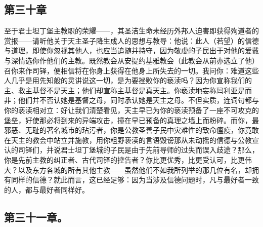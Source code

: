 
\subsection{第三十章}

\par

至于君士坦丁堡主教职的荣耀——，其圣洁生命未经历外邦人迫害即获得殉道者的赏报——请听他关于天主圣子降生成人的思想与教导：他说：此人（若望）的信德与道理，即使你忽视其他人，也应当追随并持守，因为敬虔的子民出于对他的爱戴与深情选你作他们的主教。既然教会从安提约基雅教会（此教会从前亦选立了他）召你来作司铎，便相信将在你身上获得在他身上所失去的一切。我问你：难道这些人几乎是用先知般的灵讲说这一切，是为要挫败你的亵渎吗？因为你宣称我们的主、救主基督不是天主；他们却宣称主基督是真天主。你亵渎地妄称玛利亚是而非；他们并不否认她是基督之母，同时承认她是天主之母。不但实质，连词句都与你的亵渎相对立：好让我们清楚看见，天主早已为你的亵渎预备了一座不可攻克的堡垒，好使那必将到来的异端攻击，撞在早已预备的真理之墙上而粉碎。而你，最邪恶、无耻的著名城市的玷污者，你是公教圣善子民中灾难性的致命瘟疫，你竟敢在天主的教会中站立并施教，用你粗野亵渎的言语毁谤那从未动摇的信德与公教宣认的司铎们，并说君士坦丁堡城的子民是由于先前导师的过失而误入歧途？那么，你是先前主教的纠正者、古代司铎的控告者？你比更优秀，比更受认可，比更伟大？以及东方各城的所有其他主教——虽然他们不如我所列举的那几位有名，却拥有同样的信德？就此而言，这已经足够：因为当涉及信德问题时，凡与最好者一致的人，都与最好者同样好。\par


\subsection{第三十一章。}

\par

